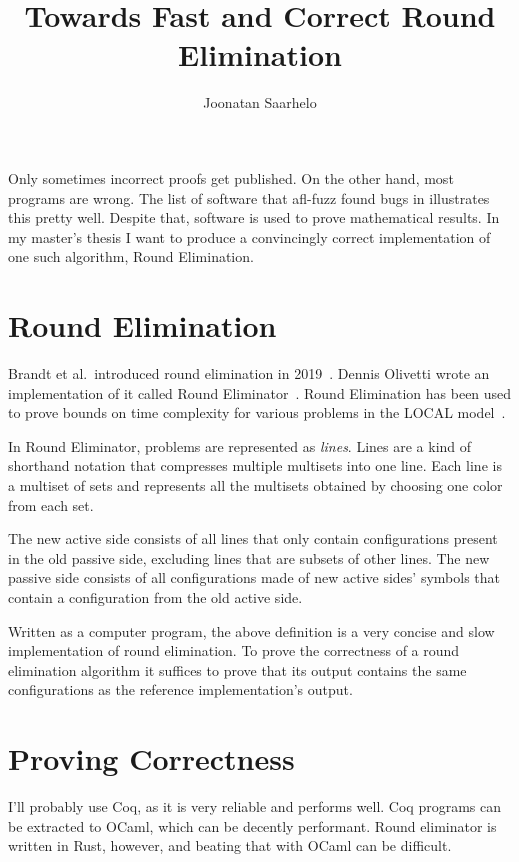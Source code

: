 \documentclass{article}
\title{Towards Fast and Correct Round Elimination}
\author{Joonatan Saarhelo}
\begin{document}
\maketitle

Only sometimes incorrect proofs get published. On the other hand, most programs are wrong. The list of software that afl-fuzz\cite{AFL} found bugs in illustrates this pretty well. Despite that, software is used to prove mathematical results. In my master's thesis I want to produce a convincingly correct implementation of one such algorithm, Round Elimination.

\section{Round Elimination}

Brandt et al.\ introduced round elimination in 2019\ \cite{speedup}. Dennis Olivetti wrote an implementation of it called Round Eliminator\ \cite{RE}. Round Elimination has been used to prove bounds on time complexity for various problems in the LOCAL model\ \cite{tc1, tc2, tc3}.

In Round Eliminator, problems are represented as \emph{lines}. Lines are a kind of shorthand notation that compresses multiple multisets into one line. Each line is a multiset of sets and represents all the multisets obtained by choosing one color from each set.\ \cite{RE}

The new active side consists of all lines that only contain configurations present in the old passive side, excluding lines that are subsets of other lines. The new passive side consists of all configurations made of new active sides' symbols that contain a configuration from the old active side.\ \cite{DA2020}

Written as a computer program, the above definition is a very concise and slow implementation of round elimination. To prove the correctness of a round elimination algorithm it suffices to prove that its output contains the same configurations as the reference implementation's output.

\section{Proving Correctness}

I'll probably use Coq, as it is very reliable and performs well. Coq programs can be extracted to OCaml, which can be decently performant. Round eliminator is written in Rust, however, and beating that with OCaml can be difficult.
\end{document}
